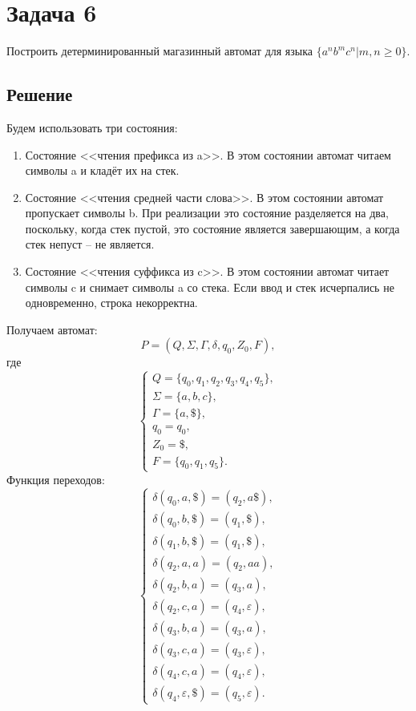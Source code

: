 \documentclass[11pt]{article}
\begin{document}
\section{Задача 6}
\label{sec:org75f7eee}
Построить детерминированный магазинный автомат для языка \(\{a^nb^mc^n | m, n \geq 0\}\).
\subsection{Решение}
\label{sec:org47397be}
Будем использовать три состояния:
\begin{enumerate}
\item Состояние {}<<чтения префикса из a>>{}. В этом состоянии автомат читаем символы a и кладёт их на стек.
\item Состояние {}<<чтения средней части слова>>{}. В этом состоянии автомат пропускает символы b. При реализации это состояние разделяется на два, поскольку, когда стек пустой, это состояние является завершающим, а когда стек непуст -- не является.
\item Состояние {}<<чтения суффикса из c>>{}. В этом состоянии автомат читает символы c и снимает символы a со стека. Если ввод и стек исчерпались не одновременно, строка некорректна.
\end{enumerate}
Получаем автомат:
\begin{equation}
P = (Q, \Sigma, \Gamma, \delta, q_0, Z_0, F),
\end{equation}
где
\begin{equation}
\begin{cases}
Q = \{q_0, q_1, q_2, q_3, q_4, q_5\}, \\
\Sigma = \{a, b, c\}, \\
\Gamma = \{a, \$\}, \\
q_0 = q_0, \\
Z_0 = \$, \\
F = \{q_0, q_1, q_5\}.
\end{cases}
\end{equation}
Функция переходов:
\begin{equation}
\begin{cases}
\delta(q_0, a, \$) = (q_2, a\$), \\
\delta(q_0, b, \$) = (q_1, \$), \\
\delta(q_1, b, \$) = (q_1, \$), \\
\delta(q_2, a, a)  = (q_2, aa), \\
\delta(q_2, b, a)  = (q_3, a), \\
\delta(q_2, c, a)  = (q_4, \varepsilon), \\
\delta(q_3, b, a)  = (q_3, a), \\
\delta(q_3, c, a)  = (q_3, \varepsilon), \\
\delta(q_4, c, a)  = (q_4, \varepsilon), \\
\delta(q_4, \varepsilon, \$) = (q_5, \varepsilon).
\end{cases}
\end{equation}
\end{document}
